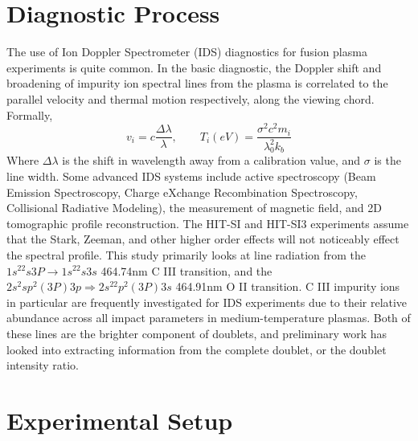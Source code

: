 \documentclass{AIAA}
\begin{document}
\section{Diagnostic Process}
\hspace{4ex}The use of Ion Doppler Spectrometer (IDS) diagnostics for fusion plasma experiments is quite common\cite{den1994fast}. In the basic diagnostic, the Doppler shift and broadening of impurity ion spectral lines from the plasma is correlated to the parallel velocity and thermal motion respectively, along the viewing chord. Formally, \\
\begin{equation}\label{Doppler_Eqns}
v_i = c\frac{\Delta\lambda}{\lambda},\qquad
T_i(eV) = \frac{\sigma^2c^2m_i}{\lambda_0^2k_b}
\end{equation} 
Where $\Delta\lambda$ is the shift in wavelength away from a calibration value, and $\sigma$ is the line width.
Some advanced IDS systems include active spectroscopy (Beam Emission Spectroscopy\cite{mckee1999beam}, Charge eXchange Recombination Spectroscopy\cite{fonck1984determination}, Collisional Radiative Modeling\cite{burgos2012hybrid}), the measurement of magnetic field\cite{den2006advances}, and 2D tomographic profile reconstruction\cite{tanabe2013two}. The HIT-SI and HIT-SI3 experiments assume that the Stark, Zeeman, and other higher order effects will not noticeably effect the spectral profile. This study primarily looks at line radiation from the $1s^22s3P\rightarrow1s^22s3s$ 464.74nm C III transition, and the $2s^2sp^2(3P)3p\Rightarrow2s^22p^2(3P)3s$ 464.91nm O II transition. C III impurity ions in particular are frequently investigated for IDS experiments due to their relative abundance across all impact parameters in medium-temperature plasmas\cite{cothran2006fast}. Both of these lines are the brighter component of doublets, and preliminary work has looked into extracting information from the complete doublet, or the doublet intensity ratio. 

\section{Experimental Setup}
\end{document}
